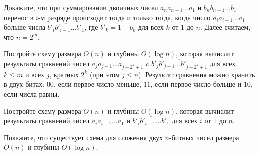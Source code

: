 \begin{enumcyr}
    \item Докажите, что при суммировании двоичных чисел $\overline{a_n a_{n - 1} \dots a_1}$ и $\overline{b_{n} b_{n - 1}
        \dots b_1}$ перенос в $i$-м разряде происходит тогда и только тогда, когда число $\overline{a_i a_{i - 1} \dots a_1}$
    	больше числа $\overline{b'_{i} b'_{i - 1} \dots b'_{1}}$, где $b'_k = 1 - b_k$ для всех $k$ от $1$ до $n$.
	    Далее считаем, что $n = 2^m$.
    \item Постройте схему размера $O(n)$ и глубины $O(\log n)$, которая вычислит результаты сравнений чисел $\overline{a_j
        a_{j - 1} \dots a_{j - 2^k + 1}}$ c $\overline{b'_j b'_{j - 1} \dots b'_{j - 2^k + 1}}$ для всех $k \le m$ и всех
	    $j$, кратных $2^k$ (при этом $j \le n$). Результат сравнения можно хранить в двух битах: $00$, если первое число
        меньше, $11$, если первое число больше и $10$, если числа равны.
    \item Постройте схему размера $O(n)$ и глубины $O(\log n)$, которая вычислит результаты сравнений чисел $\overline{a_i
        a_{i - 1} \dots a_1}$ и $\overline{b'_{i} b'_{i - 1} \dots b'_{1}}$ для всех $i$ от $1$ до $n$.
    \item Покажите, что существует схема для сложения двух $n$-битных чисел размера $O(n)$ и глубины $O(\log n)$.
\end{enumcyr}
